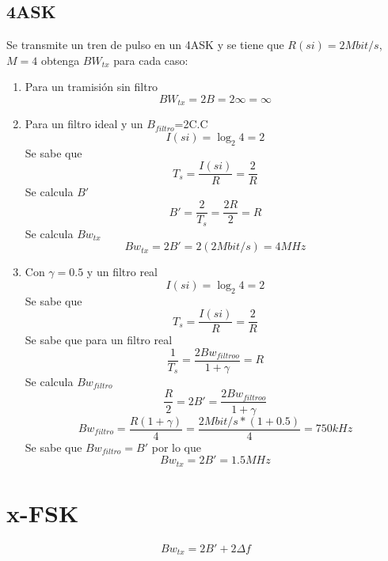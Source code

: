 \documentclass[10pt]{article}
\begin{document}
\subsection{4ASK}
Se transmite un tren de pulso en un 4ASK y se tiene que $R(si)=2Mbit/s$, $M=4$ obtenga $BW_{tx}$ para cada caso:
\begin{enumerate}
	\item Para un tramisión sin filtro
	\begin{equation}
		BW_{tx}=2B=2\infty=\infty
	\end{equation}

		\item Para un filtro ideal y un $B_{filtro}$=2C.C
		\begin{equation}
		I(si)=\log_{2}{4}=2
		\end{equation}
		Se sabe que
		\begin{equation}
			T_s=\frac{I(si)}{R}=\frac{2}{R}
		\end{equation}
		Se calcula $B'$
		\begin{equation}
			B'=\frac{2}{T_s}=\frac{2R}{2}=R
		\end{equation}
		Se calcula $Bw_{tx}$
		\begin{equation}
			Bw_{tx}=2B'=2(2Mbit/s)=4MHz
		\end{equation}
		\item Con $\gamma=0.5$ y un filtro real
			\begin{equation}
			I(si)=\log_{2}{4}=2
		\end{equation}
		Se sabe que
		\begin{equation}
			T_s=\frac{I(si)}{R}=\frac{2}{R}
		\end{equation}
		Se sabe que para un filtro real
		\begin{equation}
			\frac{1}{T_s}=\frac{2Bw_{filtroo}}{1+\gamma}=R
		\end{equation}
		Se calcula $Bw_{filtro}$
		\begin{equation}
		\frac{R}{2}=2B'=\frac{2Bw_{filtroo}}{1+\gamma}
		\end{equation}
		\begin{equation}
			Bw_{filtro}=\frac{R(1+\gamma)}{4}=\frac{2Mbit/s*(1+0.5)}{4}=750kHz
		\end{equation}
		Se sabe que $Bw_{filtro}=B'$ por lo que
		\begin{equation}
			Bw_{tx}=2B'=1.5MHz
		\end{equation}
\end{enumerate}
\section{x-FSK}
\begin{equation}
	Bw_{tx}=2B'+2\Delta f
\end{equation}
\end{document}
